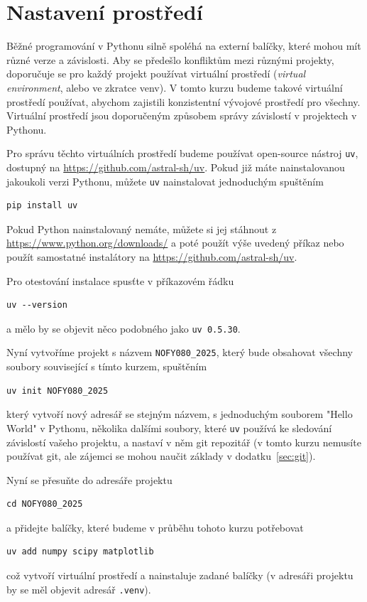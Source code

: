 \newpage
\section{Nastavení prostředí}
Běžné programování v Pythonu silně spoléhá na externí balíčky, které mohou mít různé verze a závislosti. Aby se předešlo konfliktům mezi různými projekty, doporučuje se pro každý projekt používat virtuální prostředí (\emph{virtual environment}, alebo ve zkratce venv). V tomto kurzu budeme takové virtuální prostředí používat, abychom zajistili konzistentní vývojové prostředí pro všechny. Virtuální prostředí jsou doporučeným způsobem správy závislostí v projektech v Pythonu.

Pro správu těchto virtuálních prostředí budeme používat open-source nástroj \verb|uv|, dostupný na \url{https://github.com/astral-sh/uv}. Pokud již máte nainstalovanou jakoukoli verzi Pythonu, můžete \verb|uv| nainstalovat jednoduchým spuštěním
\begin{lstlisting}
pip install uv
\end{lstlisting}
Pokud Python nainstalovaný nemáte, můžete si jej stáhnout z \url{https://www.python.org/downloads/} a poté použít výše uvedený příkaz nebo použít samostatné instalátory na \url{https://github.com/astral-sh/uv}.

Pro otestování instalace spusťte v příkazovém řádku
\begin{lstlisting}
uv --version
\end{lstlisting}
a mělo by se objevit něco podobného jako \verb|uv 0.5.30|.

Nyní vytvoříme projekt s názvem \verb|NOFY080_2025|, který bude obsahovat všechny soubory související s tímto kurzem, spuštěním
\begin{lstlisting}
uv init NOFY080_2025
\end{lstlisting}
který vytvoří nový adresář se stejným názvem, s jednoduchým souborem "Hello World" v Pythonu, několika dalšími soubory, které \verb|uv| používá ke sledování závislostí vašeho projektu, a nastaví v něm git repozitář (v tomto kurzu nemusíte používat git, ale zájemci se mohou naučit základy v dodatku~\ref{sec:git}).

Nyní se přesuňte do adresáře projektu
\begin{lstlisting}
cd NOFY080_2025
\end{lstlisting}
a přidejte balíčky, které budeme v průběhu tohoto kurzu potřebovat
\begin{lstlisting}
uv add numpy scipy matplotlib
\end{lstlisting}
což vytvoří virtuální prostředí a nainstaluje zadané balíčky (v adresáři projektu by se měl objevit adresář \verb|.venv|).


